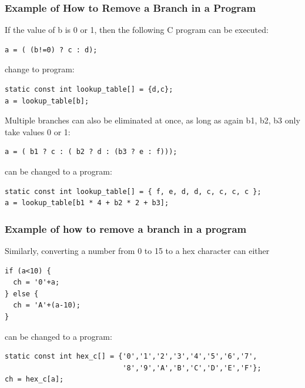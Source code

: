 \documentclass{beamer}
\begin{document}
\begin{frame}[fragile]
\frametitle{Example of How to Remove a Branch in a Program}

If the value of b is 0 or 1, then the following C program can be executed:

\begin{verbatim}
a = ( (b!=0) ? c : d);
\end{verbatim}

change to program:

\begin{verbatim}
static const int lookup_table[] = {d,c};
a = lookup_table[b];
\end{verbatim}

\bigskip
Multiple branches can also be eliminated at once, as long as again b1, b2, b3 only take values 0 or 1:

\begin{verbatim}
a = ( b1 ? c : ( b2 ? d : (b3 ? e : f)));
\end{verbatim}

can be changed to a program:

\begin{verbatim}
static const int lookup_table[] = { f, e, d, d, c, c, c, c };
a = lookup_table[b1 * 4 + b2 * 2 + b3];
\end{verbatim}
\end{frame}

\begin{frame}[fragile]
\frametitle{Example of how to remove a branch in a program}

Similarly, converting a number from 0 to 15 to a hex character can either
\begin{verbatim}
if (a<10) {
  ch = '0'+a;
} else {
  ch = 'A'+(a-10);
}
\end{verbatim}

can be changed to a program:

\begin{verbatim}
static const int hex_c[] = {'0','1','2','3','4','5','6','7',
                            '8','9','A','B','C','D','E','F'};
ch = hex_c[a];
\end{verbatim}
\end{frame}
\end{document}
